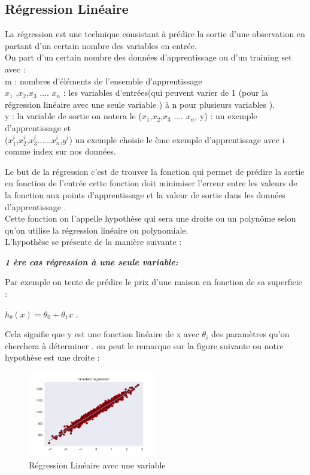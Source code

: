  \subsection{Régression Linéaire }
La régression est une technique consistant à prédire la sortie  d'une    observation en partant d'un certain nombre des variables  en entrée.\\
On part d'un certain nombre des données  d'apprentissage ou  d'un training set 
avec : \\
m :  nombres d'éléments de l'ensemble d'apprentissage \\
${x}_{1}$ ,${x}_{2}$,${x}_{3}$ .... ${x}_{n}$ : les variables d'entrées(qui peuvent varier de 1 (pour la régression linéaire avec une seule variable ) à n pour plusieurs variables  ).\\
y : la variable  de sortie 
on notera le (${x}_{1}$,${x}_{2}$,${x}_{3}$ .... ${x}_{n}$, y) : un exemple d'apprentissage
et\\
(${x}_{1}^{i}$,${x}_{2}^{i}$,${x}_{3}^{i}$......${x}_{n}^{i}$,${y}^{i}$)  un exemple choisie le ème exemple d'apprentissage avec  i comme index sur nos données.

Le but  de la régression c'est de trouver la fonction qui permet de prédire la sortie en fonction de l'entrée cette fonction doit  minimiser l'erreur entre les valeurs de la fonction aux points d'apprentissage et la valeur de sortie dans les données d'apprentissage .\\
Cette fonction on l'appelle hypothèse qui sera une droite ou un polynôme selon qu'on utilise la régression linéaire ou polynomiale. \\
L'hypothèse se présente de la manière suivante :

\textbf{\emph{1 ère cas régression à une seule variable: }} 

Par exemple on tente de prédire le prix d'une maison en fonction de sa superficie : 

${h}_{\theta}\left(x\right)={\theta }_{0}+{\theta }_{1}x$ .

Cela signifie que  y est une fonction linéaire de x avec ${\theta }_{i}$ des paramètres qu'on cherchera à déterminer .
on peut le remarque sur la figure suivante ou notre hypothèse est une droite :
\begin{figure}[ht]
	\centering
	\includegraphics[width=0.5\textwidth]{fig/linear_regression_1.png}
	\caption{Régression Linéaire avec une variable}
	\label{fig:image1}
\end{figure}

